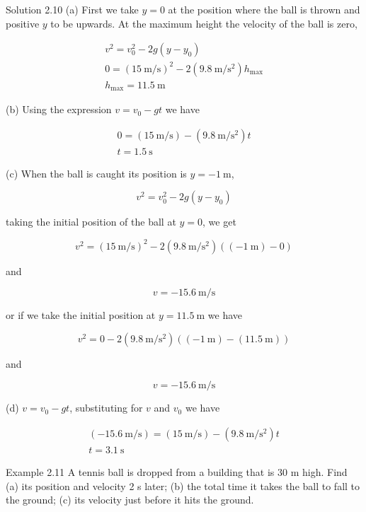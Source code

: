 \documentclass[10pt]{article}
\numberwithin{equation}{section}
\begin{document}
Solution 2.10 (a) First we take $y=0$ at the position where the ball is thrown and positive $y$ to be upwards. At the maximum height the velocity of the ball is zero,

$$
\begin{gathered}
v^{2}=v_{0}^{2}-2 g\left(y-y_{0}\right) \\
0=(15 \mathrm{~m} / \mathrm{s})^{2}-2\left(9.8 \mathrm{~m} / \mathrm{s}^{2}\right) h_{\max } \\
h_{\max }=11.5 \mathrm{~m}
\end{gathered}
$$

(b) Using the expression $v=v_{0}-g t$ we have

$$
\begin{gathered}
0=(15 \mathrm{~m} / \mathrm{s})-\left(9.8 \mathrm{~m} / \mathrm{s}^{2}\right) t \\
t=1.5 \mathrm{~s}
\end{gathered}
$$

(c) When the ball is caught its position is $y=-1 \mathrm{~m}$,

$$
v^{2}=v_{0}^{2}-2 g\left(y-y_{0}\right)
$$

taking the initial position of the ball at $y=0$, we get

$$
v^{2}=(15 \mathrm{~m} / \mathrm{s})^{2}-2\left(9.8 \mathrm{~m} / \mathrm{s}^{2}\right)((-1 \mathrm{~m})-0)
$$

and

$$
v=-15.6 \mathrm{~m} / \mathrm{s}
$$

or if we take the initial position at $y=11.5 \mathrm{~m}$ we have

$$
v^{2}=0-2\left(9.8 \mathrm{~m} / \mathrm{s}^{2}\right)((-1 \mathrm{~m})-(11.5 \mathrm{~m}))
$$

and

$$
v=-15.6 \mathrm{~m} / \mathrm{s}
$$

(d) $v=v_{0}-g t$, substituting for $v$ and $v_{0}$ we have

$$
\begin{gathered}
(-15.6 \mathrm{~m} / \mathrm{s})=(15 \mathrm{~m} / \mathrm{s})-\left(9.8 \mathrm{~m} / \mathrm{s}^{2}\right) t \\
t=3.1 \mathrm{~s}
\end{gathered}
$$

Example 2.11 A tennis ball is dropped from a building that is 30 m high. Find (a) its position and velocity 2 s later; (b) the total time it takes the ball to fall to the ground; (c) its velocity just before it hits the ground.
\end{document}
